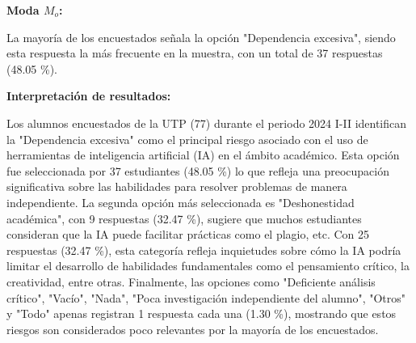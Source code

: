\textbf{Moda $M_o$:}

La mayoría de los encuestados señala la opción "Dependencia excesiva", siendo esta 
respuesta la más frecuente en la muestra, con un total de 37 respuestas (48.05 \%).

\textbf{Interpretación de resultados:}

Los alumnos encuestados de la UTP (77) durante el periodo 2024 I-II identifican la "Dependencia excesiva" como el principal riesgo asociado con el uso de herramientas de inteligencia artificial (IA) en el ámbito académico. Esta opción fue seleccionada por 37 estudiantes (48.05 \%) lo que refleja una preocupación significativa sobre las habilidades para resolver problemas de manera independiente. La segunda opción más seleccionada es "Deshonestidad académica", con 9 respuestas (32.47 \%), sugiere que muchos estudiantes consideran que la IA puede facilitar prácticas como el plagio, etc. Con 25 respuestas (32.47 \%), esta categoría refleja inquietudes sobre cómo la IA podría limitar el desarrollo de habilidades fundamentales como el pensamiento crítico, la creatividad, entre otras. Finalmente, las opciones como "Deficiente análisis crítico", "Vacío", "Nada", "Poca investigación independiente del alumno", "Otros" y "Todo" apenas registran 1 respuesta cada una (1.30 \%), mostrando que estos riesgos son considerados poco relevantes por la mayoría de los encuestados.
